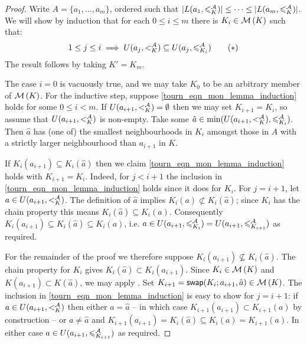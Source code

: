 \begin{proof}
    Write $A = \{a_1,\ldots,a_m\}$, ordered such that $|L(a_1, {\leqslant^{\mathcal{A}}_K})| \le
    \cdots \le |L(a_m, {\leqslant^{\mathcal{A}}_K})|$. We will show by induction that for each $0
    \le i \le m$ there is $K_i \in \operatorname{\mathcal{M}}\left({K}\right)$ such that:
    \[
        1 \le j \le i
        \implies
        U(a_j, {<^{\mathcal{A}}_K}) \subseteq U(a_j, {\leqslant^{\mathcal{A}}_{K_i}})
        \tag{$\ast$}
        \label{tourn_eqn_mon_lemma_induction}
    \]
    The result follows by taking $K' = K_m$.

    The case $i=0$ is vacuously true, and we may take $K_0$ to be an arbitrary
    member of $\operatorname{\mathcal{M}}\left({K}\right)$. For the inductive step, suppose
    \cref{tourn_eqn_mon_lemma_induction} holds for some $0 \le i < m$. If
    $U(a_{i+1}, {<^{\mathcal{A}}_K}) = \emptyset$ then we may set $K_{i+1} = K_i$, so
    assume that $U(a_{i+1}, {<^{\mathcal{A}}_K})$ is non-empty. Take some $\hat{a} \in
    \min(U(a_{i+1}, {<^{\mathcal{A}}_K}), {\leqslant^{\mathcal{A}}_{K_i}})$. Then $\hat{a}$ has (one of)
    the smallest neighbourhoods in $K_i$ amongst those in $A$ with a strictly
    larger neighbourhood than $a_{i+1}$ in $K$.

    If $K_i(a_{i+1}) \subseteq K_i(\hat{a})$ then we claim
    \cref{tourn_eqn_mon_lemma_induction} holds with $K_{i+1} = K_i$. Indeed, for
    $j < i + 1$ the inclusion in \cref{tourn_eqn_mon_lemma_induction} holds
    since it does for $K_i$. For $j = i+1$, let $a \in U(a_{i+1}, {<^{\mathcal{A}}_K})$.
    The definition of $\hat{a}$ implies $K_i(a) \not\subset K_i(\hat{a})$;
    since $K_i$ has the chain property this means $K_i(\hat{a}) \subseteq
    K_i(a)$. Consequently $K_i(a_{i+1}) \subseteq K_i(\hat{a}) \subseteq
    K_i(a)$, i.e. $a \in U(a_{i+1}, {\leqslant^{\mathcal{A}}_{K_i}}) = U(a_{i+1},
    {\leqslant^{\mathcal{A}}_{K_{i+1}}})$ as required.

    For the remainder of the proof we therefore suppose $K_i(a_{i+1})
    \not\subseteq K_i(\hat{a})$. The chain property for $K_i$ gives
    $K_i(\hat{a}) \subset K_i(a_{i+1})$. Since $K_i \in \operatorname{\mathcal{M}}\left({K}\right)$ and
    $K(a_{i+1}) \subset K(\hat{a})$, we may apply
    . Set $K_{i+1} =
    \mathsf{swap}({K_i}; {a_{i+1}}, {\hat{a}}) \in \operatorname{\mathcal{M}}\left({K}\right)$. The inclusion in
    \cref{tourn_eqn_mon_lemma_induction} is easy to show for $j=i+1$: if $a \in
    U(a_{i+1}, {<^{\mathcal{A}}_K})$ then either $a = \hat{a}$ -- in which case
    $K_{i+1}(a_{i+1}) \subset K_{i+1}(a)$ by construction -- or $a \ne \hat{a}$
    and $K_{i+1}(a_{i+1}) = K_i(\hat{a}) \subseteq K_i(a) = K_{i+1}(a)$. In
    either case $a \in U(a_{i+1}, {\leqslant^{\mathcal{A}}_{K_{i+1}}})$ as required.


\end{proof}
